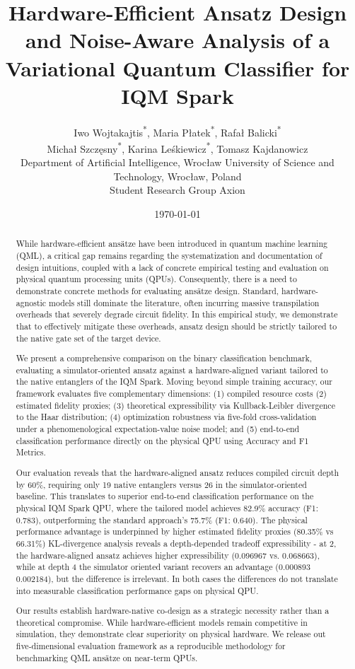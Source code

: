 \documentclass[11pt]{article}
\title{Hardware-Efficient Ansatz Design and Noise-Aware Analysis of a Variational Quantum Classifier for IQM Spark}
\author{
\begin{tabular}{c}
Iwo Wojtakajtis\textsuperscript{*}, Maria P{\l}atek\textsuperscript{*}, Rafa{\l} Balicki\textsuperscript{*}\\
Micha{\l} Szcz{\k{e}}sny\textsuperscript{*}, Karina Le{\'s}kiewicz\textsuperscript{*}, Tomasz Kajdanowicz\\[0.5em]
\small Department of Artificial Intelligence, Wroc{\l}aw University of Science and Technology, Wroc{\l}aw, Poland\\
\small Student Research Group Axion
\end{tabular}
}
\date{\today}
\begin{document}
\maketitle

\begin{abstract}
While hardware-efficient ansätze have been introduced in quantum machine learning (QML), a critical gap remains regarding the systematization and documentation of design intuitions, coupled with a lack of concrete empirical testing and evaluation on physical quantum processing units (QPUs). Consequently, there is a need to demonstrate concrete methods for evaluating  ansätze design. Standard, hardware-agnostic models still dominate the literature, often incurring massive transpilation overheads that severely degrade circuit fidelity. In this empirical study, we demonstrate that to effectively mitigate these overheads, ansatz design should be strictly tailored to the native gate set of the target device.

We present a comprehensive comparison on the binary classification benchmark, evaluating a simulator-oriented ansatz against a hardware-aligned variant tailored to the native entanglers of the IQM Spark. Moving beyond simple training accuracy, our framework evaluates five complementary dimensions: (1) compiled resource costs (2) estimated fidelity proxies; (3) theoretical expressibility via Kullback-Leibler divergence to the Haar distribution; (4) optimization robustness via five-fold cross-validation under a phenomenological expectation-value noise model; and (5) end-to-end classification performance directly on the physical QPU using Accuracy and F1 Metrics. 

Our evaluation reveals that the hardware-aligned ansatz reduces compiled circuit depth by 60\%, requiring only 19 native entanglers versus 26 in the simulator-oriented baseline. This translates to superior end-to-end classification performance on the physical IQM Spark QPU, where the tailored model achieves 82.9\% accuracy (F1: 0.783), outperforming the standard approach's 75.7\% (F1: 0.640). The physical performance advantage is underpinned by higher estimated fidelity proxies (80.35\% vs 66.31\%) KL-divergence analysis reveals a depth-depended tradeoff expressibility - at 2, the hardware-aligned ansatz achieves higher expressibility (0.096967 vs. 0.068663), while at depth 4 the simulator oriented variant recovers an advantage (0.000893 0.002184), but the difference is irrelevant. In both cases the differences do not translate into measurable classification performance gaps on physical QPU. 

Our results establish hardware-native co-design as a strategic necessity rather than a theoretical compromise. While hardware-efficient models remain competitive in simulation, they demonstrate clear superiority on physical hardware. We release out five-dimensional evaluation framework as a reproducible methodology for benchmarking QML ansätze on near-term QPUs.

\end{abstract}
\end{document}
